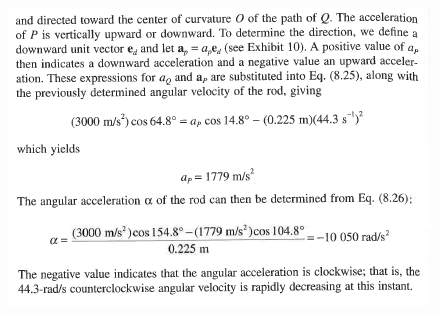 \documentclass[11pt]{article}
\begin{document}
\begin{itemize}
\includegraphics[scale=1.1]{example_8_12b.png}


\end{itemize}
\newpage

	
\end{document}
